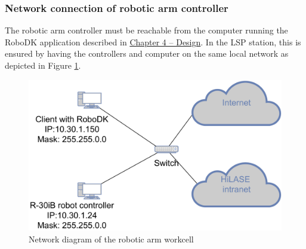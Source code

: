 \subsubsection*{Network connection of robotic arm controller}


The robotic arm controller must be reachable from the computer running the RoboDK application described in \hyperref[chap:design]{Chapter 4 -- Design}. In the LSP station, this is ensured by having the controllers and computer on the same local network as depicted in Figure \ref{fig:network}. 

\begin{figure}[h]
    \centering
    \includegraphics[width=0.8\linewidth]{img/network.pdf}
    \caption{Network diagram of the robotic arm workcell}
    \label{fig:network}
\end{figure}


